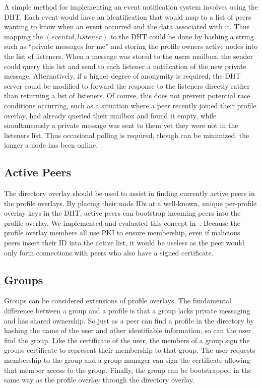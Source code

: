 \documentclass[conference]{IEEEtran}
\begin{document}
A simple method for implementing an event notification system involves using
the DHT.  Each event would have an identification that would map to a list of
peers wanting to know when an event occurred and the data associated with it.
Thus mapping the $(event id, listener)$ to the DHT could be done by hashing a
string such as ``private messages for me'' and storing the profile owners
active nodes into the list of listeners.  When a message was stored to the
users mailbox, the sender could query this list and send to each listener a
notification of the new private message.  Alternatively, if a higher degree of
anonymity is required, the DHT server could be modified to forward the response
to the listeners directly rather than returning a list of listeners.  Of
course, this does not prevent potential race conditions occurring, such as a
situation where a peer recently joined their profile overlay, had already
queried their mailbox and found it empty, while simultaneously a private
message was sent to them yet they were not in the listeners list.  Thus
occasional polling is required, though can be minimized, the longer a node has
been online.

\subsection{Active Peers}

The directory overlay should be used to assist in finding currently active
peers in the profile overlays.  By placing their node IDs at a well-known,
unique per-profile overlay keys in the DHT, active peers can bootstrap
incoming peers into the profile overlay.  We implemented and evaluated this
concept in~\cite{vpo}.  Because the profile overlay members all use PKI to
ensure membership, even if malicious peers insert their ID into the active
list, it would be useless as the peer would only form connections with peers
who also have a signed certificate.

\subsection{Groups}

Groups can be considered extensions of profile overlays.  The fundamental
difference between a group and a profile is that a group lacks private
messaging and has shared ownership.  So just as a peer can find a profile in
the directory by hashing the name of the user and other identifiable
information, so can the user find the group.  Like the certificate of the
user, the members of a group sign the groups certificate to represent their
membership to that group.  The user requests membership to the group and a
group manager can sign the certificate allowing that member access to the
group.  Finally, the group can be bootstrapped in the same way as the profile
overlay through the directory overlay.
\end{document}
